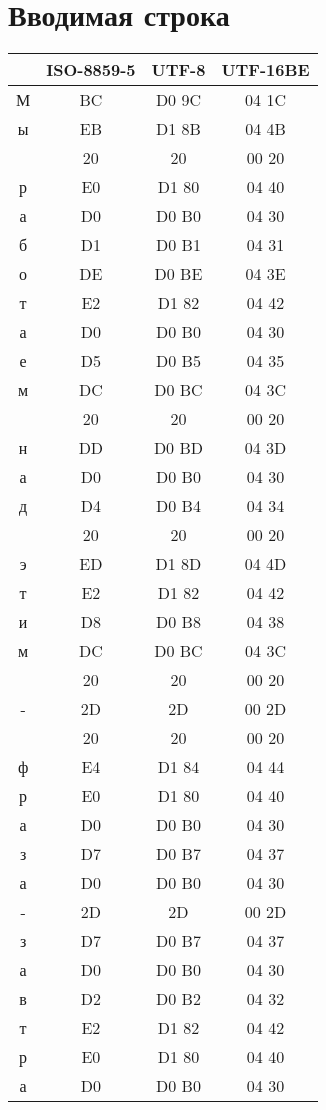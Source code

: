 \section{Вводимая строка}
\begin{center}
\begin{tabular}{|c|c|c|c|}
\hline
 & ISO-8859-5 & UTF-8 & UTF-16BE\\
\hline
М & BC & D0 9C & 04 1C\\
ы & EB & D1 8B & 04 4B\\
& 20 & 20 & 00 20\\
р & E0 & D1 80 & 04 40\\
а & D0 & D0 B0 & 04 30\\
б & D1 & D0 B1 & 04 31\\
о & DE & D0 BE & 04 3E\\
т & E2 & D1 82 & 04 42\\
а & D0 & D0 B0 & 04 30\\
е & D5 & D0 B5 & 04 35\\
м & DC & D0 BC & 04 3C\\
& 20 & 20 & 00 20\\
н & DD & D0 BD & 04 3D\\
а & D0 & D0 B0 & 04 30\\
д & D4 & D0 B4 & 04 34\\
& 20 & 20 & 00 20\\
э & ED & D1 8D & 04 4D\\
т & E2 & D1 82 & 04 42\\
и & D8 & D0 B8 & 04 38\\
м & DC & D0 BC & 04 3C\\
& 20 & 20 & 00 20\\
- & 2D & 2D & 00 2D\\
& 20 & 20 & 00 20\\
ф & E4 & D1 84 & 04 44\\
р & E0 & D1 80 & 04 40\\
а & D0 & D0 B0 & 04 30\\
з & D7 & D0 B7 & 04 37\\
а & D0 & D0 B0 & 04 30\\
- & 2D & 2D & 00 2D\\
з & D7 & D0 B7 & 04 37\\
а & D0 & D0 B0 & 04 30\\
в & D2 & D0 B2 & 04 32\\
т & E2 & D1 82 & 04 42\\
р & E0 & D1 80 & 04 40\\
а & D0 & D0 B0 & 04 30\\

\end{tabular}
\end{center}
